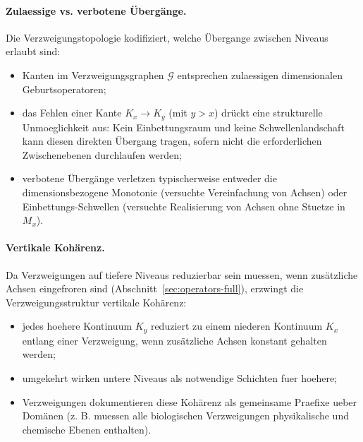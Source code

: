 \paragraph{Zulaessige vs. verbotene Übergänge.}
Die Verzweigungstopologie kodifiziert, welche Übergange zwischen Niveaus
erlaubt sind:
\begin{itemize}
  \item Kanten im Verzweigungsgraphen \(\mathcal{G}\) entsprechen zulaessigen
dimensionalen Geburtsoperatoren;
  \item das Fehlen einer Kante \(K_x \to K_y\) (mit \(y>x\)) drückt eine
        strukturelle Unmoeglichkeit aus: Kein Einbettungsraum und keine
        Schwellenlandschaft kann diesen direkten Übergang tragen, sofern nicht
        die erforderlichen Zwischenebenen durchlaufen werden;
  \item verbotene Übergänge verletzen typischerweise entweder die dimensionsbezogene
        Monotonie (versuchte Vereinfachung von Achsen) oder Einbettungs-Schwellen
        (versuchte Realisierung von Achsen ohne Stuetze in \(M_x\)).
\end{itemize}

\paragraph{Vertikale Kohärenz.}
Da Verzweigungen auf tiefere Niveaus reduzierbar sein muessen, wenn
zusätzliche Achsen eingefroren sind (Abschnitt~\ref{sec:operators-full}), erzwingt
die Verzweigungsstruktur vertikale Kohärenz:
\begin{itemize}
  \item jedes hoehere Kontinuum \(K_y\) reduziert zu einem niederen Kontinuum
        \(K_x\) entlang einer Verzweigung, wenn zusätzliche Achsen konstant
        gehalten werden;
  \item umgekehrt wirken untere Niveaus als notwendige Schichten fuer hoehere;
  \item Verzweigungen dokumentieren diese Kohärenz als gemeinsame Praefixe
        ueber Domänen (z. B. muessen alle biologischen Verzweigungen
        physikalische und chemische Ebenen enthalten).
\end{itemize}

